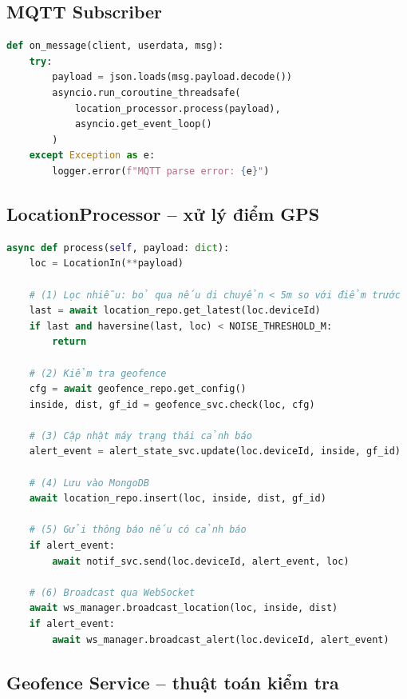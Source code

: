 \subsection{MQTT Subscriber}

\begin{lstlisting}[language=python, caption=services/mqtt\_service.py -- callback xử lý tin nhắn]
def on_message(client, userdata, msg):
    try:
        payload = json.loads(msg.payload.decode())
        asyncio.run_coroutine_threadsafe(
            location_processor.process(payload),
            asyncio.get_event_loop()
        )
    except Exception as e:
        logger.error(f"MQTT parse error: {e}")
\end{lstlisting}

\subsection{LocationProcessor -- xử lý điểm GPS}

\begin{lstlisting}[language=python, caption=Lõi xử lý trong location\_processor.py]
async def process(self, payload: dict):
    loc = LocationIn(**payload)

    # (1) Lọc nhiễu: bỏ qua nếu di chuyển < 5m so với điểm trước
    last = await location_repo.get_latest(loc.deviceId)
    if last and haversine(last, loc) < NOISE_THRESHOLD_M:
        return

    # (2) Kiểm tra geofence
    cfg = await geofence_repo.get_config()
    inside, dist, gf_id = geofence_svc.check(loc, cfg)

    # (3) Cập nhật máy trạng thái cảnh báo
    alert_event = alert_state_svc.update(loc.deviceId, inside, gf_id)

    # (4) Lưu vào MongoDB
    await location_repo.insert(loc, inside, dist, gf_id)

    # (5) Gửi thông báo nếu có cảnh báo
    if alert_event:
        await notif_svc.send(loc.deviceId, alert_event, loc)

    # (6) Broadcast qua WebSocket
    await ws_manager.broadcast_location(loc, inside, dist)
    if alert_event:
        await ws_manager.broadcast_alert(loc.deviceId, alert_event)
\end{lstlisting}

\subsection{Geofence Service -- thuật toán kiểm tra}

